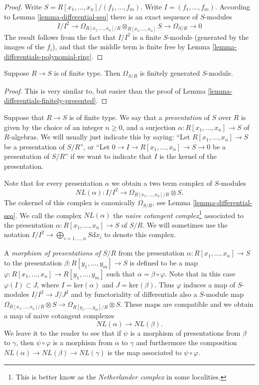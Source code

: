 \begin{proof}
Write $S = R[x_1,\ldots,x_n]/(f_1, \ldots, f_m)$. 
Write $I = (f_1, \ldots, f_m)$. According
to Lemma \ref{lemma-differential-seq} there is an exact sequence
of $S$-modules
$$
I/I^2
\to
\Omega_{R[x_1,\ldots,x_n]/R}\otimes_{R[x_1,\ldots,x_n]} S
\to 
\Omega_{S/R}
\to
0
$$
The result follows from the fact that $I/I^2$ is a finite 
$S$-module (generated by the images of the $f_i$), and that
the middle term is finite free by
Lemma \ref{lemma-differentials-polynomial-ring}.
\end{proof}

\begin{lemma}
\label{lemma-differentials-finitely-generated}
Suppose $R \to S$ is of finite type.
Then $\Omega_{S/R}$ is finitely generated
$S$-module.
\end{lemma}

\begin{proof}
This is very similar to, but easier than the proof
of Lemma \ref{lemma-differentials-finitely-presented}.
\end{proof}

\noindent
Suppose that $R \to S$ is of finite type.
We say that a {\it presentation} of $S$ over $R$ is
given by the choice of an integer $n \geq 0$, and
a surjection $\alpha : R[x_1,\ldots,x_n] \to S$
of $R$-algebras. We will usually just indicate
this by saying: ``Let $R[x_1,\ldots,x_n] \to S$ be a presentation of
$S/R$'', or ``Let $0\to I \to R[x_1,\ldots,x_n] \to S \to 0$
be a presentation of $S/R$'' if we want to indicate that $I$
is the kernel of the presentation.

\medskip\noindent
Note that for every presentation $\alpha$ we obtain a two term
complex of $S$-modules
$$
NL(\alpha) :
I/I^2 \longrightarrow \Omega_{R[x_1,\ldots,x_n]/R}\otimes S.
$$
The cokernel of this complex is canonically $\Omega_{S/R}$,
see Lemma \ref{lemma-differential-seq}. We call the complex
$NL(\alpha)$
the {\it naive cotangent complex}\footnote{This is better know as the {\it Netherlander complex} in some localities.} associated to the
presentation $\alpha : R[x_1,\ldots,x_n] \to S$ of $S/R$. We will
sometimes use the notation
$I/I^2 \to \bigoplus_{i=1,\ldots,n} S\text{d}x_i$
to denote this complex.

\medskip\noindent
A {\it morphism of presentations of $S/R$} from the presentation
$\alpha : R[x_1,\ldots,x_n] \to S$ to the presentation
$\beta : R[y_1,\ldots,y_m] \to S$ is defined to be a
map $\varphi : R[x_1,\ldots,x_n] \to R[y_1,\ldots,y_m]$
such that $\alpha = \beta \circ \varphi$. Note that
in this case $\varphi(I) \subset J$, where $I = \text{ker}(\alpha)$
and $J = \text{ker}(\beta)$. Thus $\varphi$ induces a map
of $S$-modules $I/I^2 \to J/J^2$ and by functoriality of
differentials also a $S$-module map
$\Omega_{R[x_1,\ldots,x_n]/R}\otimes S
\to \Omega_{R[y_1,\ldots,y_m]/R}\otimes S$.
These maps are compatible and we obtain a map
of naive cotangent complexes
$$
NL(\alpha) \longrightarrow NL(\beta).
$$
We leave it to the reader to see that if $\psi$ is a morphism
of presentations from $\beta$ to $\gamma$, then $\psi \circ \varphi$
is a morphism from $\alpha$ to $\gamma$ and furthermore 
the composition $NL(\alpha) \to NL(\beta) \to NL(\gamma)$
is the map associated to $\psi \circ \varphi$.

